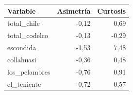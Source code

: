 \begin{tabular}{lrr}
\toprule
Variable & Asimetría & Curtosis \\
\midrule
total\_chile & -0,12 & 0,69 \\
total\_codelco & -0,13 & -0,29 \\
escondida & -1,53 & 7,48 \\
collahuasi & -0,36 & 0,48 \\
los\_pelambres & -0,76 & 0,91 \\
el\_teniente & -0,72 & 0,57 \\
\bottomrule
\end{tabular}
